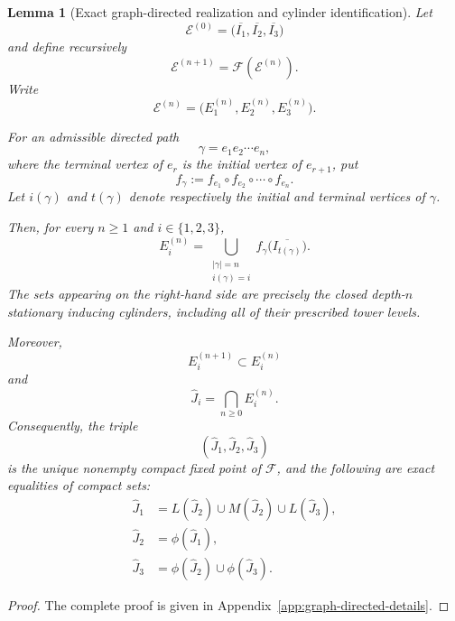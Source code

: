 \documentclass[11pt]{amsart}
\theoremstyle{plain}
\newtheorem{lemma}[theorem]{Lemma}
\theoremstyle{definition}
\theoremstyle{remark}
\begin{document}
\begin{lemma}[Exact graph-directed realization and cylinder identification]
\label{lem:BT-exact-graph-directed}
Let
\[
        \mathcal E^{(0)}
        =
        \bigl(
        \overline{I_1},
        \overline{I_2},
        \overline{I_3}
        \bigr)
\]
and define recursively
\[
        \mathcal E^{(n+1)}
        =
        \mathcal F(\mathcal E^{(n)}).
\]
Write
\[
        \mathcal E^{(n)}
        =
        \bigl(
        E_1^{(n)},E_2^{(n)},E_3^{(n)}
        \bigr).
\]

For an admissible directed path
\[
        \gamma=e_1e_2\cdots e_n,
\]
where the terminal vertex of \(e_r\) is the initial vertex of \(e_{r+1}\),
put
\[
        f_\gamma
        :=
        f_{e_1}\circ f_{e_2}\circ\cdots\circ f_{e_n}.
\]
Let \(i(\gamma)\) and \(t(\gamma)\) denote respectively the initial and
terminal vertices of \(\gamma\).

Then, for every \(n\geq1\) and \(i\in\{1,2,3\}\),
\[
        E_i^{(n)}
        =
        \bigcup_{\substack{|\gamma|=n\\ i(\gamma)=i}}
        f_\gamma\bigl(\overline{I_{t(\gamma)}}\bigr).
\tag{8.10}
\label{eq:BT-cylinder-union}
\]
The sets appearing on the right-hand side are precisely the closed
depth-\(n\) stationary inducing cylinders, including all of their prescribed
tower levels.

Moreover,
\[
        E_i^{(n+1)}\subset E_i^{(n)}
\]
and
\[
        \widehat J_i
        =
        \bigcap_{n\geq0}E_i^{(n)}.
\tag{8.11}
\label{eq:BT-cylinder-intersection}
\]
Consequently, the triple
\[
        (\widehat J_1,\widehat J_2,\widehat J_3)
\]
is the unique nonempty compact fixed point of \(\mathcal F\), and the
following are exact equalities of compact sets:
\[
\begin{aligned}
        \widehat J_1
        &=
        L(\widehat J_2)
        \cup
        M(\widehat J_2)
        \cup
        L(\widehat J_3),\\
        \widehat J_2
        &=
        \phi(\widehat J_1),\\
        \widehat J_3
        &=
        \phi(\widehat J_2)
        \cup
        \phi(\widehat J_3).
\end{aligned}
\tag{8.12}
\label{eq:BT-exact-graph-directed}
\]
\end{lemma}

\begin{proof}
The complete proof is given in Appendix~\ref{app:graph-directed-details}.
\end{proof}
\end{document}
